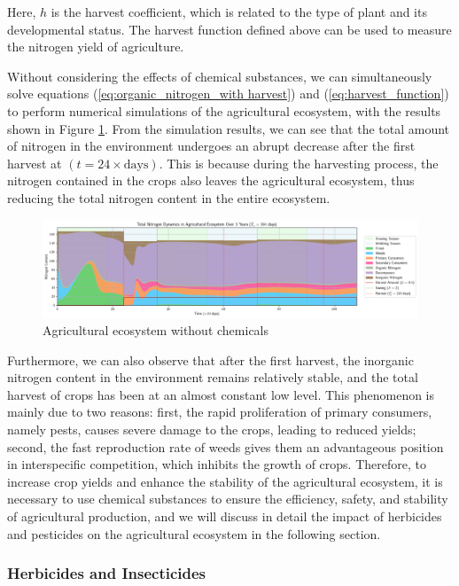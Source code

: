 \documentclass{mcmthesis}
\begin{document}
Here, $h$ is the harvest coefficient, which is related to the type of plant and its developmental status. The harvest function defined above can be used to measure the nitrogen yield of agriculture.

Without considering the effects of chemical substances, we can simultaneously solve equations (\ref{eq:organic_nitrogen_with harvest}) and (\ref{eq:harvest_function}) to perform numerical simulations of the agricultural ecosystem, with the results shown in Figure \ref{fig:model2_no_chem}. From the simulation results, we can see that the total amount of nitrogen in the environment undergoes an abrupt decrease after the first harvest at $(t = 24 \times \text{days})$. This is because during the harvesting process, the nitrogen contained in the crops also leaves the agricultural ecosystem, thus reducing the total nitrogen content in the entire ecosystem.
\begin{figure}[h] 
\centering
\includegraphics[width=\textwidth]{figures/model2_no_chem.png}
\setlength{\abovecaptionskip}{-0.5cm}
\caption{Agricultural ecosystem without chemicals}
\label{fig:model2_no_chem}
\end{figure}

Furthermore, we can also observe that after the first harvest, the inorganic nitrogen content in the environment remains relatively stable, and the total harvest of crops has been at an almost constant low level. This phenomenon is mainly due to two reasons: first, the rapid proliferation of primary consumers, namely pests, causes severe damage to the crops, leading to reduced yields; second, the fast reproduction rate of weeds gives them an advantageous position in interspecific competition, which inhibits the growth of crops. Therefore, to increase crop yields and enhance the stability of the agricultural ecosystem, it is necessary to use chemical substances to ensure the efficiency, safety, and stability of agricultural production, and we will discuss in detail the impact of herbicides and pesticides on the agricultural ecosystem in the following section.
\subsubsection{Herbicides and Insecticides}  
\end{document}
